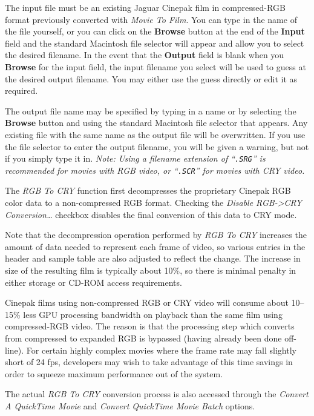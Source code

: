 \documentclass[12pt,letterpaper,twoside]{article}
\begin{document}
The input file must be an existing Jaguar Cinepak film in compressed-RGB format previously converted
with \textit{Movie To Film}. You can type in the name of the file yourself, or you can click on the
\textbf{Browse} button at the end of the \textbf{Input} field and the standard Macintosh file
selector will appear and allow you to select the desired filename. In the event that the
\textbf{Output} field is blank when you \textbf{Browse} for the input field, the input filename you
select will be used to guess at the desired output filename. You may either use the guess directly
or edit it as required.

The output file name may be specified by typing in a name or by selecting the \textbf{Browse} button
and using the standard Macintosh file selector that appears. Any existing file with the same name as
the output file will be overwritten. If you use the file selector to enter the output filename, you
will be given a warning, but not if you simply type it in. \textit{Note: Using a filename extension
of ``\texttt{.SRG}'' is recommended for movies with RGB video, or ``\texttt{.SCR}'' for movies with
CRY video.}

The \textit{RGB To CRY} function first decompresses the proprietary Cinepak RGB color data to a
non-compressed RGB format. Checking the \textit{Disable RGB->CRY Conversion\ldots} checkbox
disables the final conversion of this data to CRY mode.

Note that the decompression operation performed by \textit{RGB To CRY} increases the amount of data
needed to represent each frame of video, so various entries in the header and sample table are also
adjusted to reflect the change. The increase in size of the resulting film is typically about 10\%,
so there is minimal penalty in either storage or CD-ROM access requirements.

Cinepak films using non-compressed RGB or CRY video will consume about 10--15\% less GPU processing
bandwidth on playback than the same film using compressed-RGB video. The reason is that the
processing step which converts from compressed to expanded RGB is bypassed (having already been done
off-line). For certain highly complex movies where the frame rate may fall slightly short of 24 fps,
developers may wish to take advantage of this time savings in order to squeeze maximum performance
out of the system.

The actual \textit{RGB To CRY} conversion process is also accessed through the \textit{Convert A
QuickTime Movie} and \textit{Convert QuickTime Movie Batch} options.
\end{document}
